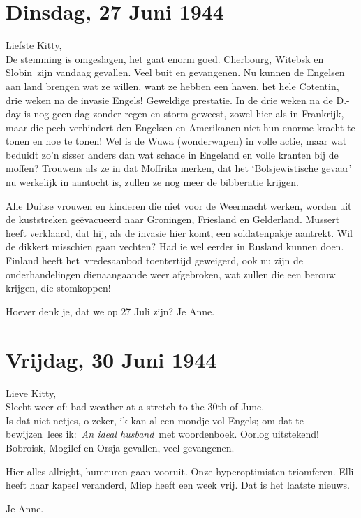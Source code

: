 \documentclass{book}
\begin{document}
\chapter{Dinsdag, 27 Juni 1944}

Liefste Kitty,\\De stemming is omgeslagen, het gaat enorm goed.
Cherbourg, Witebsk en Slobin~zijn vandaag gevallen. Veel buit en
gevangenen. Nu kunnen de Engelsen aan land brengen wat ze willen, want
ze hebben een haven, het hele Cotentin, drie weken na de invasie Engels!
Geweldige prestatie. In de drie weken na de D.-day is nog geen dag
zonder regen en storm geweest, zowel hier als in Frankrijk, maar die
pech verhindert den Engelsen en Amerikanen niet hun enorme kracht te
tonen en hoe te tonen! Wel is de Wuwa (wonderwapen) in volle actie, maar
wat beduidt zo'n sisser anders dan wat schade in Engeland en volle
kranten bij de moffen? Trouwens als ze in dat Moffrika merken, dat het
`Bolsjewistische gevaar' nu werkelijk in aantocht is, zullen ze nog meer
de bibberatie krijgen.

Alle Duitse vrouwen en kinderen die niet voor de Weermacht werken,
worden uit de kuststreken geëvacueerd naar Groningen, Friesland en
Gelderland. Mussert heeft verklaard, dat hij, als de invasie hier komt,
een soldatenpakje aantrekt. Wil de dikkert misschien gaan vechten? Had
ie wel eerder in Rusland kunnen doen. Finland heeft het~vredesaanbod
toentertijd geweigerd, ook nu zijn de onderhandelingen dienaangaande
weer afgebroken, wat zullen die een berouw krijgen, die stomkoppen!

Hoever denk je, dat we op 27 Juli zijn? Je Anne.

\chapter{Vrijdag, 30 Juni 1944}

Lieve Kitty,\\Slecht weer of: bad weather at a stretch to the 30th of
June.\\Is dat niet netjes, o zeker, ik kan al een mondje vol Engels; om
dat te bewijzen~lees ik:~\emph{An ideal husband}~met woordenboek. Oorlog
uitstekend! Bobroisk, Mogilef en Orsja gevallen, veel gevangenen.

Hier alles allright, humeuren gaan vooruit. Onze hyperoptimisten
triomferen. Elli heeft haar kapsel veranderd, Miep heeft een week vrij.
Dat is het laatste nieuws.

Je Anne.
\end{document}
